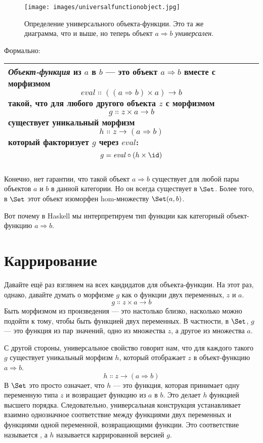 \begin{figure}[H]
  \centering
  \texttt{[image: images/universalfunctionobject.jpg]}
  \caption{Определение универсального объекта-функции. Это та же
    диаграмма, что и выше, но теперь объект $a \Rightarrow b$ \emph{универсален}.}
\end{figure}

\noindent
Формально:

\begin{longtable}[]{@{}l@{}}
  \toprule
  \begin{minipage}[t]{0.97\columnwidth}\raggedright\strut
    \emph{Объект-функция} из $a$ в $b$ --- это объект
    $a \Rightarrow b$ вместе с морфизмом
    \[\mathit{eval} \Colon ((a \Rightarrow b) \times a) \to b\]
    такой, что для любого другого объекта $z$ с морфизмом
    \[g \Colon z \times a \to b\]
    существует уникальный морфизм
    \[h \Colon z \to (a \Rightarrow b)\]
    который факторизует $g$ через $\mathit{eval}$:
    \[g = \mathit{eval} \circ (h \times \id)\]
  \end{minipage}\tabularnewline
  \bottomrule
\end{longtable}

\noindent
Конечно, нет гарантии, что такой объект $a \Rightarrow b$ существует
для любой пары объектов $a$ и $b$ в данной категории.
Но он всегда существует в $\Set$. Более того, в $\Set$ этот
объект изоморфен hom-множеству $\Set(a, b)$.

Вот почему в Haskell мы интерпретируем тип функции
 как категорный объект-функцию $a \Rightarrow b$.

\section{Каррирование}

Давайте ещё раз взглянем на всех кандидатов для объекта-функции.
На этот раз, однако, давайте думать о морфизме $g$ как о функции
двух переменных, $z$ и $a$.
\[g \Colon z \times a \to b\]
Быть морфизмом из произведения --- это настолько близко, насколько можно подойти к тому, чтобы быть
функцией двух переменных. В частности, в $\Set$, $g$ ---
это функция из пар значений, одно из множества $z$, а другое
из множества $a$.

С другой стороны, универсальное свойство говорит нам, что для каждого такого
$g$ существует уникальный морфизм $h$, который отображает $z$ в
объект-функцию $a \Rightarrow b$.
\[h \Colon z \to (a \Rightarrow b)\]
В $\Set$ это просто означает, что $h$ --- это функция, которая
принимает одну переменную типа $z$ и возвращает функцию из
$a$ в $b$. Это делает $h$ функцией высшего порядка.
Следовательно, универсальная конструкция устанавливает взаимно однозначное
соответствие между функциями двух переменных и функциями одной
переменной, возвращающими функции. Это соответствие называется
, а $h$ называется каррированной версией $g$.

